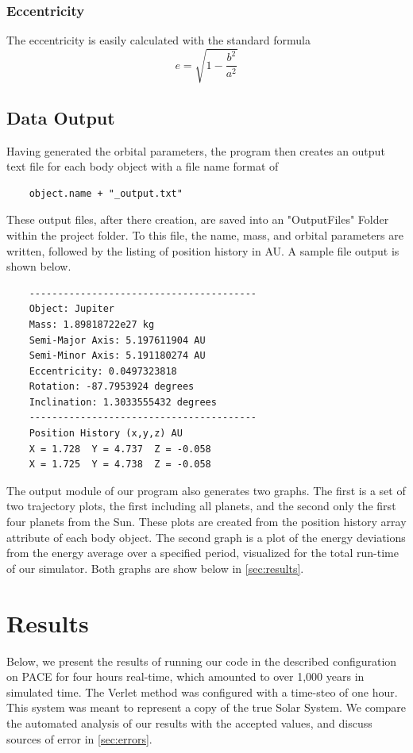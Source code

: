 \documentclass[a4paper,12pt]{article} %
\numberwithin{equation}{section} %
\numberwithin{figure}{section} %
\begin{document}
\subsubsection{Eccentricity}

The eccentricity is easily calculated with the standard formula $$e=\sqrt{1-\frac{b^2}{a^2}}$$

\subsection{Data Output}
Having generated the orbital parameters, the program then creates an output text file for each body object with a file name format of

\begin{verbatim}
    object.name + "_output.txt"
\end{verbatim}

These output files, after there creation, are saved into an "OutputFiles" Folder within the project folder. To this file, the name, mass, and orbital parameters are written, followed by the listing of position history in AU. A sample file output is shown below.

\begin{verbatim}
    ----------------------------------------
    Object: Jupiter
    Mass: 1.89818722e27 kg
    Semi-Major Axis: 5.197611904 AU
    Semi-Minor Axis: 5.191180274 AU
    Eccentricity: 0.0497323818
    Rotation: -87.7953924 degrees
    Inclination: 1.3033555432 degrees
    ----------------------------------------
    Position History (x,y,z) AU
    X = 1.728  Y = 4.737  Z = -0.058
    X = 1.725  Y = 4.738  Z = -0.058
\end{verbatim}

The output module of our program also generates two graphs. The first is a set of two trajectory plots, the first including all planets, and the second only the first four planets from the Sun. These plots are created from the position history array attribute of each body object. The second graph is a plot of the energy deviations from the energy average over a specified period, visualized for the total run-time of our simulator. Both graphs are show below in \autoref{sec:results}.

\section{Results}
\label{sec:results}

Below, we present the results of running our code in the described configuration on PACE for four hours real-time, which amounted to over 1,000 years in simulated time. The Verlet method was configured with a time-steo of one hour. This system was meant to represent a copy of the true Solar System. We compare the automated analysis of our results with the accepted values, and discuss sources of error in \autoref{sec:errors}.
\end{document}
